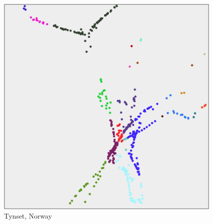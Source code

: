 \begin{appendices}
	\begin{figure}[H]
		\centering
		\includegraphics[width=11cm]{Images/computations/MINCUT2_TYNSET.png}
		\caption{Tynset, Norway}
	\end{figure}





\end{appendices}
